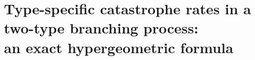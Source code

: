 \chapter[Type-specific catastrophe rates]{Type-specific catastrophe rates in a two-type branching process:\\
an exact hypergeometric formula}
\label{tt:ch:two-type}








